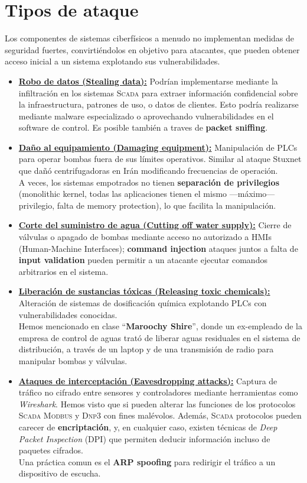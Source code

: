 \section{Tipos de ataque}
Los componentes de sistemas ciberfísicos a menudo no implementan medidas de seguridad fuertes, convirtiéndolos en objetivo para atacantes, que pueden obtener acceso inicial a un sistema explotando sus vulnerabilidades.     
\begin{itemize}[itemsep=0.5em]
   \item \textbf{\ul{Robo de datos (Stealing data):}} Podrían implementarse mediante la infiltración en los sistemas \textsc{Scada} para extraer información confidencial sobre la infraestructura, patrones de uso, o datos de clientes. Esto podría realizarse mediante malware especializado o aprovechando vulnerabilidades en el software de control. Es posible también a traves de \textbf{packet sniffing}.
   
   \item \textbf{\ul{Daño al equipamiento (Damaging equipment):}} Manipulación de PLCs para operar bombas fuera de sus límites operativos. Similar al ataque Stuxnet que dañó centrifugadoras en Irán modificando frecuencias de operación.\\
   A veces, los sistemas empotrados no tienen \textbf{separación de privilegios} (monolithic kernel, todas las aplicaciones tienen el mismo ---máximo--- privilegio, falta de memory protection), lo que facilita la manipulación.
   
   \item \textbf{\ul{Corte del suministro de agua (Cutting off water supply):}} Cierre de válvulas o apagado de bombas mediante acceso no autorizado a \textsc{HMI}s (Human-Machine Interfaces);
   \textbf{command injection} ataques juntos a falta de \textbf{input validation} pueden permitir a un atacante ejecutar comandos arbitrarios en el sistema.
   
   \item \textbf{\ul{Liberación de sustancias tóxicas (Releasing toxic chemicals):}} Alteración de sistemas de dosificación química explotando {\textsc{PLC}}s con vulnerabilidades conocidas.\\
   Hemos mencionado en clase ``\textbf{Maroochy Shire}'', donde un ex-empleado de la empresa de control de aguas trató de liberar aguas residuales en el sistema de distribución, a través de un laptop y de una transmisión de radio para manipular bombas y válvulas.
   
   \item \textbf{\ul{Ataques de interceptación (Eavesdropping attacks):}} Captura de tráfico no cifrado entre sensores y controladores mediante herramientas como \textit{Wireshark}. Hemos visto que si pueden {alterar las funciones} de los protocolos \textsc{Scada} \textsc{Modbus} y \textsc{Dnp3} con fines malévolos. Además, \textsc{Scada} protocolos pueden carecer de \textbf{encriptación}, y, en cualquier caso, existen técnicas de \textit{Deep Packet Inspection} (\textsc{DPI}) que permiten deducir información incluso de paquetes cifrados.\\
   Una práctica comun es el \textbf{ARP spoofing} para redirigir el tráfico a un dispositivo de escucha.
   

\end{itemize}
